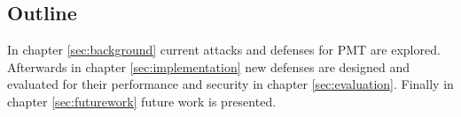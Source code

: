 \subsection{Outline}
In chapter \ref{sec:background} current attacks and defenses for \gls{PMT} are explored. Afterwards in chapter \ref{sec:implementation} new defenses are designed and evaluated for their performance and security in chapter \ref{sec:evaluation}. Finally in chapter \ref{sec:futurework} future work is presented.